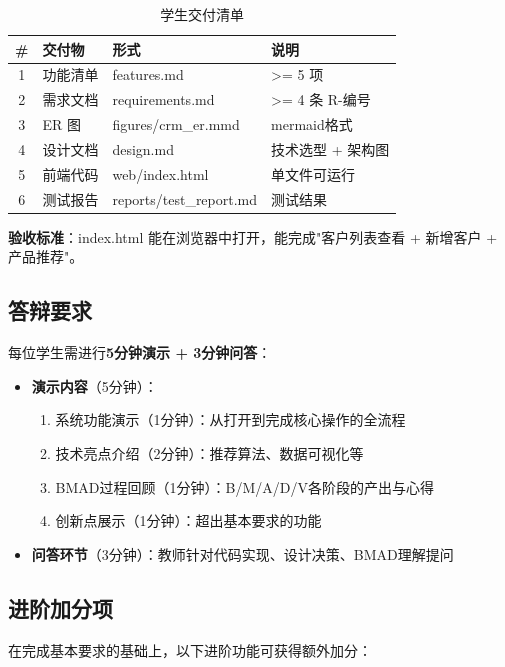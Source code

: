 \begin{table}[H]
\centering
\begin{tabular}{clll}
\toprule
\textbf{\#} & \textbf{交付物} & \textbf{形式} & \textbf{说明} \\
\midrule
1 & 功能清单 & features.md & >= 5 项 \\
2 & 需求文档 & requirements.md & >= 4 条 R-编号 \\
3 & ER 图 & figures/crm\_er.mmd & mermaid格式 \\
4 & 设计文档 & design.md & 技术选型 + 架构图 \\
5 & 前端代码 & web/index.html & 单文件可运行 \\
6 & 测试报告 & reports/test\_report.md & 测试结果 \\
\bottomrule
\end{tabular}
\caption{学生交付清单}
\end{table}

\textbf{验收标准}：index.html 能在浏览器中打开，能完成"客户列表查看 + 新增客户 + 产品推荐"。

\subsection{答辩要求}

每位学生需进行\textbf{5分钟演示 + 3分钟问答}：

\begin{itemize}[leftmargin=2em]
  \item \textbf{演示内容}（5分钟）：
  \begin{enumerate}[leftmargin=2em]
    \item 系统功能演示（1分钟）：从打开到完成核心操作的全流程
    \item 技术亮点介绍（2分钟）：推荐算法、数据可视化等
    \item BMAD过程回顾（1分钟）：B/M/A/D/V各阶段的产出与心得
    \item 创新点展示（1分钟）：超出基本要求的功能
  \end{enumerate}
  \item \textbf{问答环节}（3分钟）：教师针对代码实现、设计决策、BMAD理解提问
\end{itemize}

\subsection{进阶加分项}

在完成基本要求的基础上，以下进阶功能可获得额外加分：

